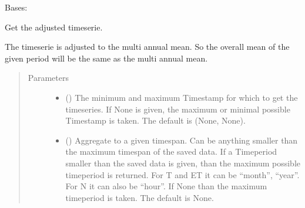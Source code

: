 \documentclass[letterpaper,10pt,english]{sphinxmanual}
\begin{document}
\begin{fulllineitems}
\label{\detokenize{weatherDB:weatherDB.station.StationNBase}}
\sphinxAtStartPar
Bases: {\hyperref[\detokenize{weatherDB:weatherDB.station.StationBase}]{}}

\begin{fulllineitems}
\label{\detokenize{weatherDB:weatherDB.station.StationNBase.get_adj}}
\sphinxAtStartPar
Get the adjusted timeserie.

\sphinxAtStartPar
The timeserie is adjusted to the multi annual mean.
So the overall mean of the given period will be the same as the multi annual mean.
\begin{quote}\begin{description}
\item[{Parameters}] \leavevmode\begin{itemize}
\item {} 
\sphinxAtStartPar
{} ({\hyperref[\detokenize{weatherDB.lib:weatherDB.lib.utils.TimestampPeriod}]{}}\sphinxstyleliteralemphasis{\sphinxupquote{(}}\sphinxstyleliteralemphasis{\sphinxupquote{)}}\sphinxstyleliteralemphasis{\sphinxupquote{, }}) \textendash{} The minimum and maximum Timestamp for which to get the timeseries.
If None is given, the maximum or minimal possible Timestamp is taken.
The default is (None, None).

\item {} 
\sphinxAtStartPar
{} (\sphinxstyleliteralemphasis{\sphinxupquote{, }}) \textendash{} Aggregate to a given timespan.
Can be anything smaller than the maximum timespan of the saved data.
If a Timeperiod smaller than the saved data is given, than the maximum possible timeperiod is returned.
For T and ET it can be “month”, “year”.
For N it can also be “hour”.
If None than the maximum timeperiod is taken.
The default is None.


\end{itemize}
\end{description}
\end{quote}
\end{fulllineitems}
\end{fulllineitems}
\end{document}
